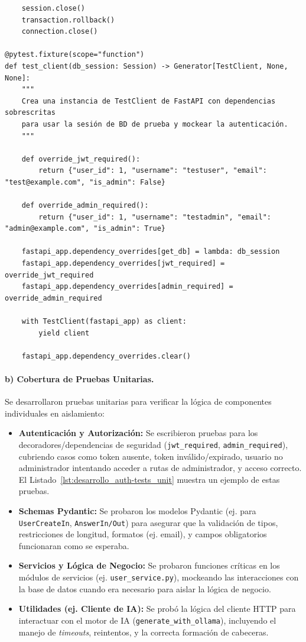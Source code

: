 \begin{lstlisting}
    session.close()
    transaction.rollback()
    connection.close()

@pytest.fixture(scope="function")
def test_client(db_session: Session) -> Generator[TestClient, None, None]:
    """
    Crea una instancia de TestClient de FastAPI con dependencias sobrescritas
    para usar la sesión de BD de prueba y mockear la autenticación.
    """
    
    def override_jwt_required():
        return {"user_id": 1, "username": "testuser", "email": "test@example.com", "is_admin": False}

    def override_admin_required():
        return {"user_id": 1, "username": "testadmin", "email": "admin@example.com", "is_admin": True}

    fastapi_app.dependency_overrides[get_db] = lambda: db_session
    fastapi_app.dependency_overrides[jwt_required] = override_jwt_required
    fastapi_app.dependency_overrides[admin_required] = override_admin_required
    
    with TestClient(fastapi_app) as client:
        yield client

    fastapi_app.dependency_overrides.clear()
\end{lstlisting}

\paragraph{b) Cobertura de Pruebas Unitarias.}
Se desarrollaron pruebas unitarias para verificar la lógica de componentes individuales en aislamiento:
\begin{itemize}[leftmargin=*]
  \item \textbf{Autenticación y Autorización:} Se escribieron pruebas para los decoradores/dependencias de seguridad (\texttt{jwt\_required}, \texttt{admin\_required}), cubriendo casos como token ausente, token inválido/expirado, usuario no administrador intentando acceder a rutas de administrador, y acceso correcto. El Listado~\ref{lst:desarrollo_auth-tests_unit} muestra un ejemplo de estas pruebas.
  \item \textbf{Schemas Pydantic:} Se probaron los modelos Pydantic (ej. para \texttt{UserCreateIn}, \texttt{AnswerIn/Out}) para asegurar que la validación de tipos, restricciones de longitud, formatos (ej. email), y campos obligatorios funcionaran como se esperaba.
  \item \textbf{Servicios y Lógica de Negocio:} Se probaron funciones críticas en los módulos de servicios (ej. \texttt{user\_service.py}), mockeando las interacciones con la base de datos cuando era necesario para aislar la lógica de negocio.
  \item \textbf{Utilidades (ej. Cliente de IA):} Se probó la lógica del cliente HTTP para interactuar con el motor de IA (\texttt{generate\_with\_ollama}), incluyendo el manejo de \emph{timeouts}, reintentos, y la correcta formación de cabeceras.
\end{itemize}

